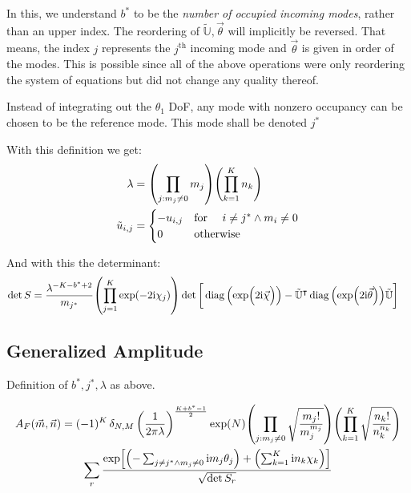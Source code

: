 \documentclass[
	english,
	a4paper,
	fontsize=10pt,
	parskip=half,
	titlepage=true,
	DIV=12,
	final
]{scrreprt}
\newcommand*{\transp}{\ensuremath{^\intercal}}
\newcommand*{\iunit}{\ensuremath{\mathrm{i}}}
\DeclareMathOperator{\diag}{diag}
\begin{document}
In this, we understand $b^*$ to be the \emph{number of occupied incoming modes}, rather than an upper index. The reordering of $\tilde{\mathbb{U}}, \vec{\theta}$ will implicitly be reversed. That means, the index $j$ represents the $j^{\text{th}}$ incoming mode and $\vec{\theta}$ is given in order of the modes. This is possible since all of the above operations were only reordering the system of equations but did not change any quality thereof.

Instead of integrating out the $\theta_1$ DoF, any mode with nonzero occupancy can be chosen to be the reference mode. This mode shall be denoted $j^*$

With this definition we get:
\begin{align}
	\lambda
&=
	\qty( \prod_{j : m_j \neq 0} m_j )
	\qty( \prod_{k=1}^{K}   n_k )
\label{eqn:DefLambdaNonBZO_m}
\\
	\tilde{u}_{i,j} 
&=
	\begin{cases}
		-u_{i,j}		&\qq*{for } i \neq j^* \land m_i \neq 0 \\
		0			&\qotherwise*
	\end{cases}
\label{eqn:DefReducedDFTNonBZO_m}
\end{align}

And with this the determinant:
\begin{align}
	\det S
&=
	\frac{ \lambda^{-K - b^* + 2} }{ m_{j^*} }
	\qty( \prod_{j=1}^{K} \exp(-2\iunit \chi_j) )
	\det\qty[\bigg.
		\diag\qty(\exp(\Big.2\iunit\vec{\chi}))
		-
		\tilde{\mathbb{U}}\transp
		\diag\qty(\exp(2\iunit\vec{\theta}))
		\tilde{\mathbb{U}}
	]
\label{eqn:detSNonBZO_m}
\end{align}

\subsection{Generalized Amplitude}
Definition of $b^*, j^*, \lambda$ as above.

\begin{multline}
	A_F(\vec{m}, \vec{n})
=
	(-1)^K \, \delta_{N,M} \, \qty(
		\frac{1}{2\pi\lambda}
	)^{\frac{K + b^* - 1}{2}}
	\exp(N)
	\qty( \prod_{j : m_j \neq 0}
		\sqrt{\frac
			{ m_j! }
			{ m_j^{m_j} }
	})
	\qty( \prod_{k=1}^{K}
		\sqrt{\frac
			{ n_k! }
			{ n_k^{n_k} }
	})
\\
	\sum_r
		\frac
		{\exp[
			\qty(- \sum_{j\neq j^* \land m_j \neq 0} \iunit m_j \theta_j) + 
			\qty(  \sum_{k=1}^{K}                    \iunit n_k \chi  _k)
		]}
		{\sqrt{\det S_r}}
\end{multline}
\end{document}
